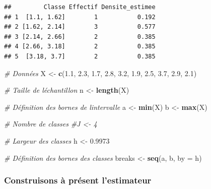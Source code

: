 \documentclass[
  12pt,
]{article}
\newenvironment{Shaded}{\begin{snugshade}}{\end{snugshade}}
\newcommand{\AttributeTok}[1]{\textcolor[rgb]{0.13,0.29,0.53}{#1}}
\newcommand{\CommentTok}[1]{\textcolor[rgb]{0.56,0.35,0.01}{\textit{#1}}}
\newcommand{\FloatTok}[1]{\textcolor[rgb]{0.00,0.00,0.81}{#1}}
\newcommand{\FunctionTok}[1]{\textcolor[rgb]{0.13,0.29,0.53}{\textbf{#1}}}
\newcommand{\NormalTok}[1]{#1}
\newcommand{\OtherTok}[1]{\textcolor[rgb]{0.56,0.35,0.01}{#1}}
\begin{document}
\begin{verbatim}
##         Classe Effectif Densite_estimee
## 1  [1.1, 1.62]        1           0.192
## 2 [1.62, 2.14]        3           0.577
## 3 [2.14, 2.66]        2           0.385
## 4 [2.66, 3.18]        2           0.385
## 5  [3.18, 3.7]        2           0.385
\end{verbatim}

\begin{Shaded}
\begin{Highlighting}[]
\CommentTok{\# Données}
\NormalTok{X }\OtherTok{\textless{}{-}} \FunctionTok{c}\NormalTok{(}\FloatTok{1.1}\NormalTok{, }\FloatTok{2.3}\NormalTok{, }\FloatTok{1.7}\NormalTok{, }\FloatTok{2.8}\NormalTok{, }\FloatTok{3.2}\NormalTok{, }\FloatTok{1.9}\NormalTok{, }\FloatTok{2.5}\NormalTok{, }\FloatTok{3.7}\NormalTok{, }\FloatTok{2.9}\NormalTok{, }\FloatTok{2.1}\NormalTok{)}

\CommentTok{\# Taille de l\textquotesingle{}échantillon}
\NormalTok{n }\OtherTok{\textless{}{-}} \FunctionTok{length}\NormalTok{(X)}

\CommentTok{\# Définition des bornes de l\textquotesingle{}intervalle}
\NormalTok{a }\OtherTok{\textless{}{-}} \FunctionTok{min}\NormalTok{(X)}
\NormalTok{b }\OtherTok{\textless{}{-}} \FunctionTok{max}\NormalTok{(X)}

\CommentTok{\# Nombre de classes}
\CommentTok{\#J \textless{}{-} 4}

\CommentTok{\# Largeur des classes}
\NormalTok{h }\OtherTok{\textless{}{-}} \FloatTok{0.9973}

\CommentTok{\# Définition des bornes des classes}
\NormalTok{breaks }\OtherTok{\textless{}{-}} \FunctionTok{seq}\NormalTok{(a, b, }\AttributeTok{by =}\NormalTok{ h)}
\end{Highlighting}
\end{Shaded}

\subsubsection{Construisons à présent
l'estimateur}\label{construisons-uxe0-pruxe9sent-lestimateur-1}
\end{document}
